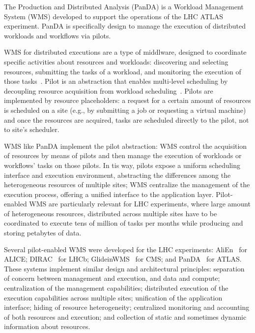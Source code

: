 The Production and Distributed Analysis (PanDA) is a Workload Management System
(WMS) developed to support the operations of the LHC ATLAS experiment. PanDA is
specifically design to manage the execution of distributed workloads and
workflows via pilots.

WMS for distributed executions are a type of middlware, designed to coordinate
specific activities about resources and workloads: discovering and selecting
resources, submitting the tasks of a workload, and monitoring the execution of
those tasks~\cite{marco2009glite}. Pilot is an abstraction that enables
multi-level scheduling by decoupling resource acquisition from workload
scheduling~\cite{turilli2015comprehensive}. Pilots are implemented by resource
placeholders: a request for a certain amount of resources is scheduled on a site
(e.g., by submitting a job or requesting a virtual machine) and once the
resources are acquired, tasks are scheduled directly to the pilot, not to site's
scheduler.

WMS like PanDA implement the pilot abstraction: WMS control the acquisition of
resources by means of pilots and then manage the execution of workloads or
workflows' tasks on those pilots. In tis way, pilots expose a uniform scheduling
interface and execution environment, abstracting the differences among the
heterogeneous resources of multiple sites; WMS centralize the management of the
execution process, offering a unified interface to the application layer.
Pilot-enabled WMS are particularly relevant for LHC experiments, where large
amount of heterogeneous resources, distributed across multiple sites have to be
coordinated to execute tens of million of tasks per months while producing and
storing petabytes of data.

Several pilot-enabled WMS were developed for the LHC experiments:
AliEn~\cite{Bagnasco2010} for ALICE; DIRAC~\cite{Paterson2010} for LHCb;
GlideinWMS~\cite{sfiligoi2008glideinwms} for CMS; and
PanDA~\cite{maeno2014evolution} for ATLAS. These systems implement similar
design and architectural principles: separation of concern between management
and execution, and data and compute; centralization of the management
capabilities; distributed execution of the execution capabilities across
multiple sites; unification of the application interface; hiding of resource
heterogeneity; centralized monitoring and accounting of both resources and
execution; and collection of static and sometimes dynamic information about
resources.

